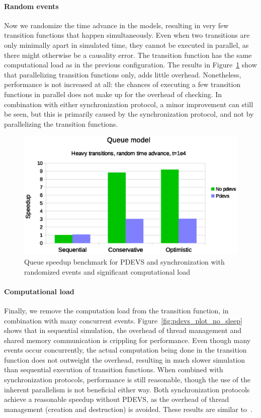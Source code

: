 \paragraph{Random events}
Now we randomize the time advance in the models, resulting in very few transition functions that happen simultaneously.
Even when two transitions are only minimally apart in simulated time, they cannot be executed in parallel, as there might otherwise be a causality error.
The transition function has the same computational load as in the previous configuration. 
The results in Figure~\ref{fig:pdevs_plot_random_sleep} show that parallelizing transition functions only, adds little overhead. 
Nonetheless, performance is not increased at all: the chances of executing a few transition functions in parallel does not make up for the overhead of checking.
In combination with either synchronization protocol, a minor improvement can still be seen, but this is primarily caused by the synchronization protocol, and not by parallelizing the transition functions.

\begin{figure}
	\center
	\includegraphics[width=\columnwidth]{fig/pdevs_random_sleep.eps}
	\caption{Queue speedup benchmark for PDEVS and synchronization with randomized events and significant computational load}
	\label{fig:pdevs_plot_random_sleep}
\end{figure}

\paragraph{Computational load}
Finally, we remove the computation load from the transition function, in combination with many concurrent events.
Figure~\ref{fig:pdevs_plot_no_sleep} shows that in sequential simulation, the overhead of thread management and shared memory communication is crippling for performance.
Even though many events occur concurrently, the actual computation being done in the transition function does not outweight the overhead, resulting in much slower simulation than sequential execution of transition functions.
When combined with synchronization protocols, performance is still reasonable, though the use of the inherent parallelism is not beneficial either way.
Both synchronization protocols achieve a reasonable speedup without PDEVS, as the overhead of thread management (creation and destruction) is avoided.
These results are similar to~\cite{Himmelspach}.
 
